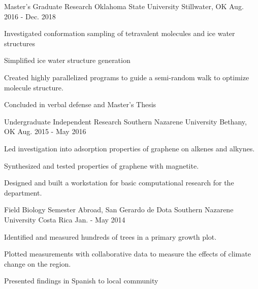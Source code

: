 

\begin{cventries}
	\vspace{-1mm}

  \cventry
    {Master's Graduate Research} %
    {Oklahoma State University} %
    {Stillwater, OK} %
    {Aug. 2016 - Dec. 2018} %
    {
      \begin{cvitems} %
        \item{Investigated conformation sampling of tetravalent molecules and ice water structures}
        \item{Simplified ice water structure generation}
        \item{Created highly parallelized programs to guide a semi-random walk to optimize molecule structure.}
        \item{Concluded in verbal defense and Master's Thesis}
		\vspace{-2mm}
      \end{cvitems}
    }

\cventry
{Undergraduate Independent Research} %
{Southern Nazarene University} %
{Bethany, OK} %
{Aug. 2015 - May 2016} %
{
	\begin{cvitems} %
		\item{Led investigation into adsorption properties of graphene on alkenes and alkynes.}
		\item{Synthesized and tested properties of graphene with magnetite.}
		\item{Designed and built a workstation for basic computational research for the department.}
		\vspace{-2mm}
	\end{cvitems}
}

\cventry
{Field Biology Semester Abroad, San Gerardo de Dota} %
{Southern Nazarene University} %
{Costa Rica} %
{Jan. - May 2014} %
{
	\begin{cvitems} %
		\item{Identified and measured hundreds of trees in a primary growth plot.}
		\item{Plotted measurements with collaborative data to measure the effects of climate change on the region.}
		\item{Presented findings in Spanish to local community}
		\vspace{-2.5mm}
	\end{cvitems}
}


\end{cventries}
